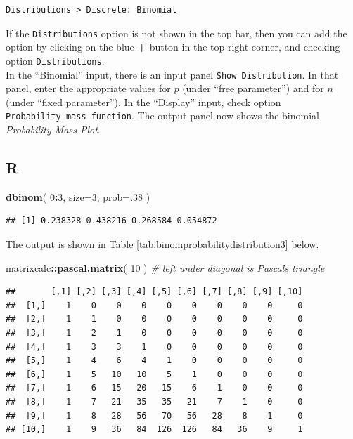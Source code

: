 \documentclass[
]{book}
\newenvironment{Shaded}{\begin{snugshade}}{\end{snugshade}}
\newcommand{\CommentTok}[1]{\textcolor[rgb]{0.56,0.35,0.01}{\textit{#1}}}
\newcommand{\DataTypeTok}[1]{\textcolor[rgb]{0.13,0.29,0.53}{#1}}
\newcommand{\DecValTok}[1]{\textcolor[rgb]{0.00,0.00,0.81}{#1}}
\newcommand{\KeywordTok}[1]{\textcolor[rgb]{0.13,0.29,0.53}{\textbf{#1}}}
\newcommand{\NormalTok}[1]{#1}
\newcommand{\OperatorTok}[1]{\textcolor[rgb]{0.81,0.36,0.00}{\textbf{#1}}}
\begin{document}
\begin{verbatim}
Distributions > Discrete: Binomial
\end{verbatim}

If the \texttt{Distributions} option is not shown in the top bar, then you can add the option by clicking on the blue \textbf{+}-button in the top right corner, and checking option \texttt{Distributions}.\\
In the ``Binomial'' input, there is an input panel \texttt{Show\ Distribution}. In that panel, enter the appropriate values for \(p\) (under ``free parameter'') and for \(n\) (under ``fixed parameter''). In the ``Display'' input, check option \texttt{Probability\ mass\ function}.
The output panel now shows the binomial \emph{Probability Mass Plot}.

\hypertarget{r-3}{%
\subsection{R}\label{r-3}}

\begin{Shaded}
\begin{Highlighting}[]
\KeywordTok{dbinom}\NormalTok{( }\DecValTok{0}\OperatorTok{:}\DecValTok{3}\NormalTok{, }\DataTypeTok{size=}\DecValTok{3}\NormalTok{, }\DataTypeTok{prob=}\NormalTok{.}\DecValTok{38}\NormalTok{ )}
\end{Highlighting}
\end{Shaded}

\begin{verbatim}
## [1] 0.238328 0.438216 0.268584 0.054872
\end{verbatim}

The output is shown in Table \ref{tab:binomprobabilitydistribution3} below.

\begin{Shaded}
\begin{Highlighting}[]
\NormalTok{matrixcalc}\OperatorTok{::}\KeywordTok{pascal.matrix}\NormalTok{( }\DecValTok{10}\NormalTok{ ) }\CommentTok{\# left under diagonal is Pascal\textquotesingle{}s triangle}
\end{Highlighting}
\end{Shaded}

\begin{verbatim}
##       [,1] [,2] [,3] [,4] [,5] [,6] [,7] [,8] [,9] [,10]
##  [1,]    1    0    0    0    0    0    0    0    0     0
##  [2,]    1    1    0    0    0    0    0    0    0     0
##  [3,]    1    2    1    0    0    0    0    0    0     0
##  [4,]    1    3    3    1    0    0    0    0    0     0
##  [5,]    1    4    6    4    1    0    0    0    0     0
##  [6,]    1    5   10   10    5    1    0    0    0     0
##  [7,]    1    6   15   20   15    6    1    0    0     0
##  [8,]    1    7   21   35   35   21    7    1    0     0
##  [9,]    1    8   28   56   70   56   28    8    1     0
## [10,]    1    9   36   84  126  126   84   36    9     1
\end{verbatim}
\end{document}
